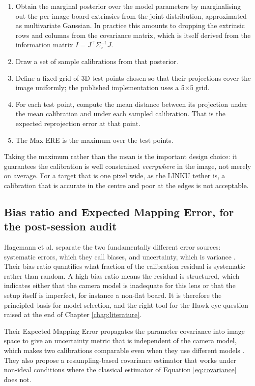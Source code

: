 \begin{enumerate}
    \item Obtain the marginal posterior over the model parameters by marginalising out the per-image board extrinsics from the joint distribution, approximated as multivariate Gaussian. In practice this amounts to dropping the extrinsic rows and columns from the covariance matrix, which is itself derived from the information matrix $I = J^{\top}\Sigma_z^{-1}J$.
    \item Draw a set of sample calibrations from that posterior.
    \item Define a fixed grid of 3D test points chosen so that their projections cover the image uniformly; the published implementation uses a 5$\times$5 grid.
    \item For each test point, compute the mean distance between its projection under the mean calibration and under each sampled calibration. That is the expected reprojection error at that point.
    \item The Max ERE is the maximum over the test points.
\end{enumerate}

Taking the maximum rather than the mean is the important design choice: it guarantees the calibration is well constrained \emph{everywhere} in the image, not merely on average. For a target that is one pixel wide, as the LINKU tether is, a calibration that is accurate in the centre and poor at the edges is not acceptable.

\subsection{Bias ratio and Expected Mapping Error, for the post-session audit}

Hagemann et al. separate the two fundamentally different error sources: systematic errors, which they call biases, and uncertainty, which is variance \cite{hagemann2021bias}. Their bias ratio quantifies what fraction of the calibration residual is systematic rather than random. A high bias ratio means the residual is structured, which indicates either that the camera model is inadequate for this lens or that the setup itself is imperfect, for instance a non-flat board. It is therefore the principled basis for model selection, and the right tool for the Hawk-eye question raised at the end of Chapter \ref{chap:literature}.

Their Expected Mapping Error propagates the parameter covariance into image space to give an uncertainty metric that is independent of the camera model, which makes two calibrations comparable even when they use different models \cite{hagemann2021bias}. They also propose a resampling-based covariance estimator that works under non-ideal conditions where the classical estimator of Equation \ref{eq:covariance} does not.


